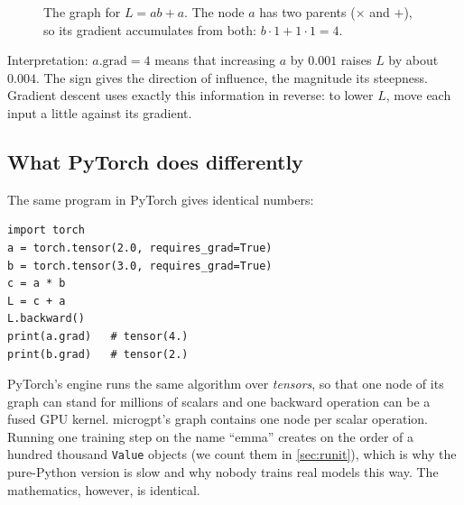 \documentclass[11pt,letterpaper]{article}
\theoremstyle{remark}
\newcommand{\code}[1]{\lstinline[basicstyle=\ttfamily\small]|#1|}
\begin{document}
\begin{figure}[h]
\centering
{}
\caption{The graph for $L = ab + a$. The node $a$ has two parents ($\times$ and $+$), so its gradient accumulates from both: $b\cdot 1 + 1\cdot 1 = 4$.}
\end{figure}

Interpretation: $a.\mathrm{grad}=4$ means that increasing $a$ by $0.001$ raises $L$ by about $0.004$. The sign gives the direction of influence, the magnitude its steepness. Gradient descent uses exactly this information in reverse: to lower $L$, move each input a little against its gradient.

\subsection{What PyTorch does differently}

The same program in PyTorch gives identical numbers:
\begin{lstlisting}
import torch
a = torch.tensor(2.0, requires_grad=True)
b = torch.tensor(3.0, requires_grad=True)
c = a * b
L = c + a
L.backward()
print(a.grad)   # tensor(4.)
print(b.grad)   # tensor(2.)
\end{lstlisting}
PyTorch's engine \parencite{paszke2019pytorch} runs the same algorithm over \emph{tensors}, so that one node of its graph can stand for millions of scalars and one backward operation can be a fused GPU kernel. microgpt's graph contains one node per scalar operation. Running one training step on the name ``emma'' creates on the order of a hundred thousand \code{Value} objects (we count them in \cref{sec:runit}), which is why the pure-Python version is slow and why nobody trains real models this way. The mathematics, however, is identical.
\end{document}
